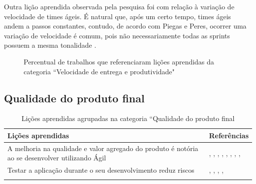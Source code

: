Outra lição aprendida observada pela pesquisa foi com relação à variação de velocidade de times ágeis. É natural que, após um certo tempo, times ágeis andem a passos constantes, contudo, de acordo com Piegas e Peres, ocorrer uma variação de velocidade é comum, pois não necessariamente todas as sprints possuem a mesma tonalidade \cite{Piegas2012}.

\begin{figure}[H]
	\centering
	\captionsetup{justification=centering}
	\caption{Percentual de trabalhos que referenciaram lições aprendidas da categoria ``Velocidade de entrega e produtividade"}
	\label{fig:produtividade}
\end{figure}

\subsection{Qualidade do produto final}

\begin{table}[H]
	\centering
	\captionsetup{justification=centering}
	\begin{tabularx}{\linewidth}{ | X | p{5cm} | } \hline \textbf{Lições aprendidas} & \textbf{Referências} \\ \hline
		A melhoria na qualidade e valor agregado do produto é notória ao se desenvolver utilizando Ágil & \cite{Adobe2012}, \cite{Fitzgerald2013}, \cite{Bustard2013}, \cite{Lapham2012}, \cite{Eunha2012}, \cite{Claudia2013}, \cite{Parzinello2012}, \cite{Maciel2013}, \cite{Ahmed2008} \\ \hline
		Testar a aplicação durante o seu desenvolvimento reduz riscos & \cite{Korhonen2010}, \cite{Lapham2012}, \cite{Eunha2012}, \cite{Parzinello2012}, \cite{Ahmed2008} \\ \hline
	\caption{Lições aprendidas agrupadas na categoria ``Qualidade do produto final}
	\end{tabularx}
\end{table}

